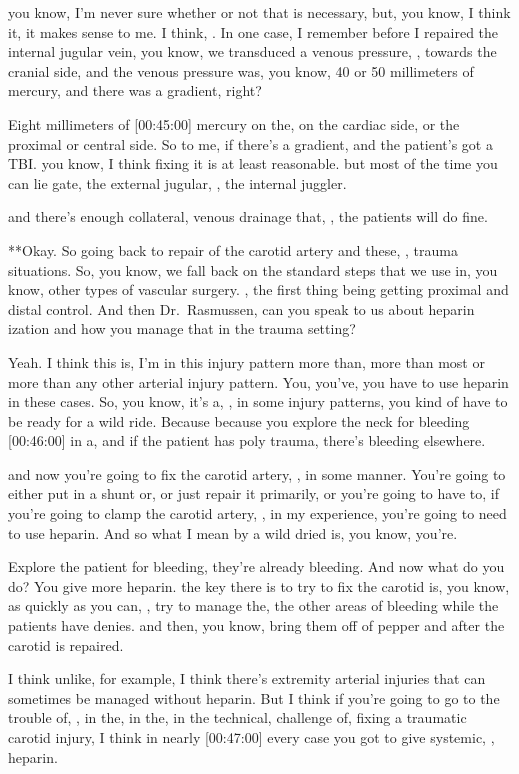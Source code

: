 \documentclass[
]{book}
\begin{document}
you know, I'm never sure whether or not that is necessary, but,
you know, I think it, it makes sense to me. I think, . In one case, I
remember before I repaired the internal jugular vein, you know, we
transduced a venous pressure, , towards the cranial side, and the venous
pressure was, you know, 40 or 50 millimeters of mercury, and there was a
gradient, right?

Eight millimeters of {[}00:45:00{]} mercury on the, on the cardiac side, or
the proximal or central side. So to me, if there's a gradient, and
the patient's got a TBI. you know, I think fixing it is at least
reasonable. but most of the time you can lie gate, the external jugular,
, the internal juggler.

and there's enough collateral, venous drainage that, , the patients
will do fine.

**Okay. So going back to repair
of the carotid artery and these, , trauma situations. So, you know, we
fall back on the standard steps that we use in, you know, other
types of vascular surgery. , the first thing being getting proximal and
distal control. And then Dr.~Rasmussen, can you speak to us about
heparin ization and how you manage that in the trauma setting?

Yeah. I think
this is, I'm in this injury pattern more than, more than most or
more than any other arterial injury pattern. You, you've, you have to
use heparin in these cases. So, you know, it's a, , in some injury
patterns, you kind of have to be ready for a wild ride. Because because
you explore the neck for bleeding {[}00:46:00{]} in a, and if the patient
has poly trauma, there's bleeding elsewhere.

and now you're going to fix the carotid artery, , in some manner.
You're going to either put in a shunt or, or just repair it primarily,
or you're going to have to, if you're going to clamp the carotid artery,
, in my experience, you're going to need to use heparin. And so what I
mean by a wild dried is, you know, you're.

Explore the patient for bleeding, they're already bleeding. And now what
do you do? You give more heparin. the key there is to try to fix the
carotid is, you know, as quickly as you can, , try to manage the, the
other areas of bleeding while the patients have denies. and then,
you know, bring them off of pepper and after the carotid is repaired.

I think unlike, for example, I think there's extremity arterial injuries
that can sometimes be managed without heparin. But I think if you're
going to go to the trouble of, , in the, in the, in the technical,
challenge of, fixing a traumatic carotid injury, I think in nearly
{[}00:47:00{]} every case you got to give systemic, , heparin.
\end{document}
